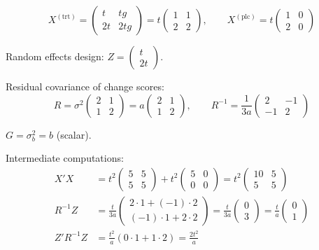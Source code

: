 \documentclass[11pt]{article}
\begin{document}
\begin{equation}
  X^{(\text{trt})} = \begin{pmatrix}
    t & tg \\ 2t & 2tg
  \end{pmatrix}
  = t\begin{pmatrix}
    1 & 1 \\ 2 & 2
  \end{pmatrix}, \qquad
  X^{(\text{plc})} = t\begin{pmatrix}
    1 & 0 \\ 2 & 0
  \end{pmatrix}
\end{equation}

Random effects design:
$Z = \begin{pmatrix} t \\ 2t \end{pmatrix}$.

Residual covariance of change scores:
\begin{equation}
  R = \sigma^2\begin{pmatrix} 2 & 1 \\ 1 & 2 \end{pmatrix}
  = a\begin{pmatrix} 2 & 1 \\ 1 & 2 \end{pmatrix}, \qquad
  R^{-1} = \frac{1}{3a}\begin{pmatrix}
    2 & -1 \\ -1 & 2
  \end{pmatrix}
\end{equation}

$G = \sigma_b^2 = b$ (scalar).

Intermediate computations:
\begin{align}
  X'X &= t^2\begin{pmatrix} 5 & 5 \\ 5 & 5 \end{pmatrix}
    + t^2\begin{pmatrix} 5 & 0 \\ 0 & 0 \end{pmatrix}
    = t^2\begin{pmatrix} 10 & 5 \\ 5 & 5 \end{pmatrix}
    \\[4pt]
  R^{-1}Z &= \frac{t}{3a}\begin{pmatrix}
    2\cdot 1 + (-1)\cdot 2 \\ (-1)\cdot 1 + 2\cdot 2
  \end{pmatrix}
  = \frac{t}{3a}\begin{pmatrix} 0 \\ 3 \end{pmatrix}
  = \frac{t}{a}\begin{pmatrix} 0 \\ 1 \end{pmatrix}
    \\[4pt]
  Z'R^{-1}Z &= \frac{t^2}{a}(0\cdot 1 + 1\cdot 2)
    = \frac{2t^2}{a}
\end{align}
\end{document}
